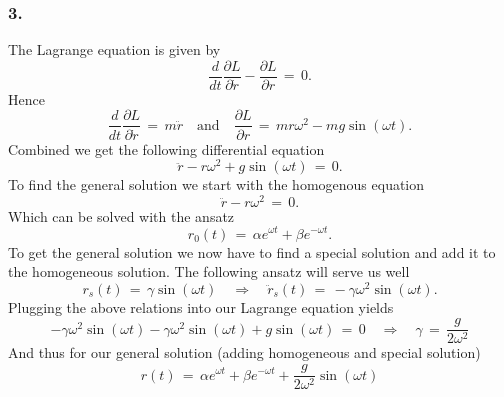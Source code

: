 \documentclass{report}
\begin{document}
\subsubsection{3.}
The Lagrange equation is given by
\begin{equation*}
  \frac{d}{dt} \frac{\partial L}{\partial \dot r} - \frac{\partial L}{\partial
r} \,=\, 0.
\end{equation*}
Hence
\begin{equation*}
  \frac{d}{dt} \frac{\partial L}{\partial \dot r} \,=\, m \ddot r \quad
\text{and} \quad \frac{\partial L}{\partial r} \,=\, mr\omega^2 - mg
\sin(\omega t).
\end{equation*}
Combined we get the following differential equation
\begin{equation*}
   \ddot r - r \omega^2 + g\sin(\omega t) \,=\, 0.
\end{equation*}
To find the general solution we start with the homogenous equation 
\begin{equation*}
  \ddot r - r\omega^2 \,=\, 0.
\end{equation*}
Which can be solved with the ansatz
\begin{equation*}
  r_0(t) \,=\, \alpha e^{\omega t} + \beta e^{-\omega t}.
\end{equation*}
To get the general solution we now have to find a special solution and add it
to the homogeneous solution. The following ansatz will serve us well
\begin{equation*}
  r_s(t) \,=\, \gamma \sin(\omega t) \quad \Rightarrow \quad \ddot r_s(t) \,=\,
-\gamma \omega^2 \sin(\omega t).
\end{equation*}
Plugging the above relations into our Lagrange equation yields
\begin{equation*}
  - \gamma \omega^2 \sin(\omega t) - \gamma \omega^2 \sin(\omega t) + g
\sin(\omega t) \,=\, 0 \quad \Rightarrow \quad \gamma \,=\, \frac{g}{2\omega^2}  
\end{equation*}
And thus for our general solution (adding homogeneous and special solution) 
\begin{equation*}
  r(t) \,=\, \alpha e^{\omega t} + \beta e^{-\omega t} + \frac{g}{2\omega^2}
\sin(\omega t)
\end{equation*}
\end{document}
